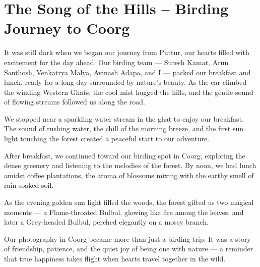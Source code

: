 \documentclass[12pt]{article}
\begin{document}
\section*{The Song of the Hills – Birding Journey to Coorg}
\label{bird:6}
\vspace{0.5em}
\noindent
\begin{minipage}[t][11.5cm][t]{11.5cm}\justifying \noindent It was still dark when we began our journey from Puttur, our hearts filled with excitement for the day ahead. Our birding team — Suresh Kamat, Arun Santhosh, Venkatrya Malya, Avinash Adapa, and I — packed our breakfast and lunch, ready for a long day surrounded by nature's beauty. As the car climbed the winding Western Ghats, the cool mist hugged the hills, and the gentle sound of flowing streams followed us along the road.\end{minipage}\hspace{0.8cm}\begin{minipage}[t][11.5cm][c]{12.0cm}\centering {}\end{minipage}
\newpage
\vspace*{0.3cm}
\noindent We stopped near a sparkling water stream in the ghat to enjoy our breakfast. The sound of rushing water, the chill of the morning breeze, and the first sun light touching the forest created a peaceful start to our adventure.

After breakfast, we continued toward our birding spot in Coorg, exploring the dense greenery and listening to the melodies of the forest. By noon, we had lunch amidst coffee plantations, the aroma of blossoms mixing with the earthy smell of rain-soaked soil.

As the evening golden sun light filled the woods, the forest gifted us two magical moments — a Flame-throated Bulbul, glowing like fire among the leaves, and later a              Grey-headed Bulbul, perched elegantly on a mossy branch.

Our photography in Coorg became more than just a birding trip. It was a story of friendship, patience, and the quiet joy of being one with nature — a reminder that true happiness takes flight when hearts travel together in the wild.
\end{document}
